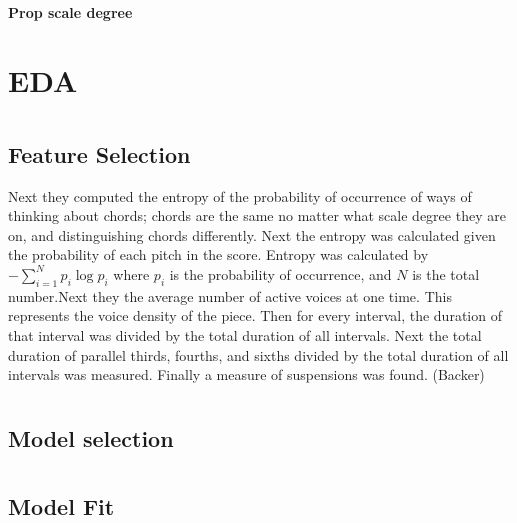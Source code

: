 \documentclass[12pt,twoside]{reedthesis}
\theoremstyle{definition}
\theoremstyle{definition}
\theoremstyle{definition}
\theoremstyle{remark}
\begin{document}
\subsubsection{Prop scale degree}\label{prop-scale-degree}

\chapter{EDA}\label{eda}

\chapter{}\label{section-2}

\section{Feature Selection}\label{feature-selection-1}

Next they computed the entropy of the probability of occurrence of ways
of thinking about chords; chords are the same no matter what scale
degree they are on, and distinguishing chords differently. Next the
entropy was calculated given the probability of each pitch in the score.
Entropy was calculated by \(-\sum_{i = 1}^{N}p_i\log{p_i}\) where
\(p_i\) is the probability of occurrence, and \(N\) is the total
number.Next they the average number of active voices at one time. This
represents the voice density of the piece. Then for every interval, the
duration of that interval was divided by the total duration of all
intervals. Next the total duration of parallel thirds, fourths, and
sixths divided by the total duration of all intervals was measured.
Finally a measure of suspensions was found. (Backer)

\chapter{}\label{section-3}

\section{Model selection}\label{model-selection}

\chapter{}\label{section-4}

\section{Model Fit}\label{model-fit}
\end{document}
